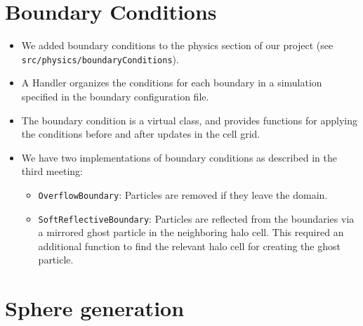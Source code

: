 \documentclass{article}
\begin{document}
\section{Boundary Conditions}
\label{sec:bound}

\begin{itemize}
    \item We added boundary conditions to the physics section of our project (see \texttt{src/physics/boundaryConditions}).
    \item A Handler organizes the conditions for each boundary in a simulation specified in the boundary configuration file.
    \item The boundary condition is a virtual class, and provides functions for applying the conditions before and after updates in the cell grid.
    \item We have two implementations of boundary conditions as described in the third meeting:
    \begin{itemize}
        \item \texttt{OverflowBoundary}: Particles are removed if they leave the domain.
        \item \texttt{SoftReflectiveBoundary}: Particles are reflected from the boundaries via a mirrored ghost particle in the neighboring halo cell. This required an additional function to find the relevant halo cell for creating the ghost particle.
    \end{itemize}
\end{itemize}

\section{Sphere generation}
\label{sec:sphere}
\end{document}
